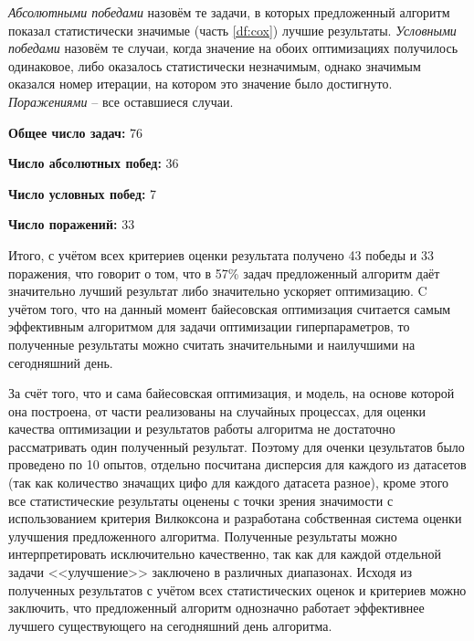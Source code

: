 \documentclass[times,specification,annotation]{itmo-student-thesis}
\begin{document}
	\textit{Абсолютными победами} назовём те задачи, в которых предложенный алгоритм показал статистически значимые (часть \ref{df:cox}) лучшие результаты. \textit{Условными победами} назовём те случаи, когда значение на обоих оптимизациях получилось одинаковое, либо оказалось статистически незначимым, однако значимым оказался номер итерации, на котором это значение было достигнуто. \textit{Поражениями} -- все оставшиеся случаи.
	\par
	
	\textbf{Общее число задач:} 76 \par
	\textbf{Число абсолютных побед:} 36 \par
	\textbf{Число условных побед:} 7 \par
	\textbf{Число поражений:} 33 \par
	
	Итого, с учётом всех критериев оценки результата получено 43 победы и 33 поражения, что говорит о том, что в 57\% задач предложенный алгоритм даёт значительно лучший результат либо значительно ускоряет оптимизацию. C учётом того, что на данный момент байесовская оптимизация считается самым эффективным алгоритмом для задачи оптимизации гиперпараметров, то полученные результаты можно считать значительными и наилучшими на сегодняшний день.	

	\chapterconclusion
	За счёт того, что и сама байесовская оптимизация, и модель, на основе которой она построена, от части реализованы на случайных процессах, для оценки качества оптимизации и результатов работы алгоритма не достаточно рассматривать один полученный результат. Поэтому для оченки цезультатов было проведено по 10 опытов, отдельно посчитана дисперсия для каждого из датасетов (так как количество значащих цифо для каждого датасета разное), кроме этого все статистические результаты оценены с точки зрения значимости с использованием критерия Вилкоксона и разработана собственная система оценки улучшения предложенного алгоритма. Полученные результаты можно интерпретировать исключительно качественно, так как для каждой отдельной задачи <<улучшение>> заключено в различных диапазонах. Исходя из полученных результатов с учётом всех статистических оценок и критериев можно заключить, что предложенный алгоритм однозначно работает эффективнее лучшего существующего на сегодняшний день алгоритма.
	
\end{document}
